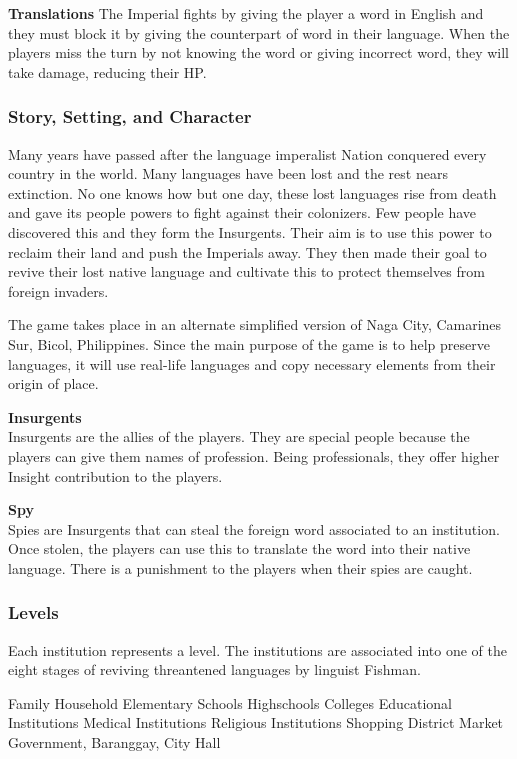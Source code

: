 \documentclass[11pt]{article}
\begin{document}
\textbf{Translations}
The Imperial fights by giving the player a word in English and they must block it by giving the counterpart of word in their language. When the players miss the turn by not knowing the word or giving incorrect word, they will take damage, reducing their HP.

\textbf{}




\subsubsection{Story, Setting, and Character}
Many years have passed after the language imperalist Nation conquered every country in the world. Many languages have been lost and the rest nears extinction. No one knows how but one day, these lost languages rise from death and gave its people powers to fight against their colonizers. Few people have discovered this and they form the Insurgents. Their aim is to use this power to reclaim their land and push the Imperials away. They then made their goal to revive their lost native language and cultivate this to protect themselves from foreign invaders. 

The game takes place in an alternate simplified version of Naga City, Camarines Sur, Bicol, Philippines. Since the main purpose of the game is to help preserve languages, it will use real-life languages and copy necessary elements from their origin of place.

\textbf{Insurgents} \\
Insurgents are the allies of the players. They are special people because the players can give them names of profession. Being professionals, they offer higher Insight contribution to the players.

\textbf{Spy}\\
Spies are Insurgents that can steal the foreign word associated to an institution. Once stolen, the players can use this to translate the word into their native language. There is a punishment to the players when their spies are caught.

\subsubsection{Levels}
Each institution represents a level. The institutions are associated into one of the eight stages of reviving threantened languages by linguist Fishman.


Family Household
Elementary Schools
Highschools
Colleges
Educational Institutions
Medical Institutions
Religious Institutions
Shopping District
Market
Government, Baranggay, City Hall
\end{document}
